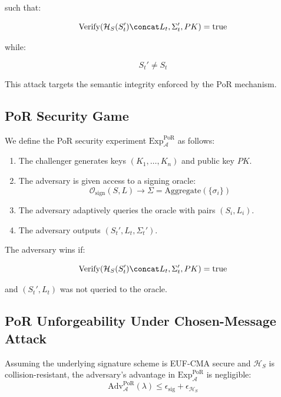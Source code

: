 such that:

\begin{equation}
\text{Verify}(\mathcal{H}_S(S_t') \concat L_t, \Sigma_t', PK) = \text{true}
\end{equation}

while:

\begin{equation}
S_t' \neq S_t
\end{equation}

This attack targets the semantic integrity enforced by the PoR mechanism.

\subsection{PoR Security Game}

We define the PoR security experiment $\text{Exp}_{\mathcal{A}}^{\text{PoR}}$ as follows:

\begin{enumerate}
\item The challenger generates keys $(K_1, \dots, K_n)$ and public key $PK$.
\item The adversary is given access to a signing oracle:
\begin{equation}
\mathcal{O}_{\text{sign}}(S, L) \rightarrow \Sigma = \text{Aggregate}(\{\sigma_i\})
\end{equation}
\item The adversary adaptively queries the oracle with pairs $(S_i, L_i)$.
\item The adversary outputs $(S_t', L_t, \Sigma_t')$.
\end{enumerate}

The adversary wins if:

\begin{equation}
\text{Verify}(\mathcal{H}_S(S_t') \concat L_t, \Sigma_t', PK) = \text{true}
\end{equation}

and $(S_t', L_t)$ was not queried to the oracle.

\subsection{PoR Unforgeability Under Chosen-Message Attack}

\begin{theorem}
Assuming the underlying signature scheme is EUF-CMA secure and $\mathcal{H}_S$ is collision-resistant, the adversary’s advantage in $\text{Exp}_{\mathcal{A}}^{\text{PoR}}$ is negligible:
\[
\text{Adv}_{\mathcal{A}}^{\text{PoR}}(\lambda) \leq \epsilon_{\text{sig}} + \epsilon_{\mathcal{H}_S}
\]
\end{theorem}

